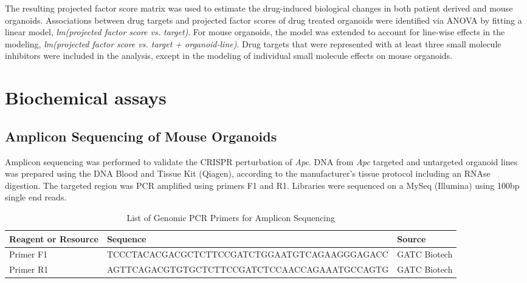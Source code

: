 \begin{flushleft}
\smallbreak
The resulting projected factor score matrix was used to estimate the drug-induced biological changes in both patient derived and mouse organoids. Associations between drug targets and projected factor scores of drug treated organoids were identified via ANOVA by fitting a linear model, \textit{lm(projected factor score vs. target)}. For mouse organoids, the model was extended to account for line-wise effects in the modeling, \textit{lm(projected factor score vs. target + organoid-line)}. Drug targets that were represented with at least three small molecule inhibitors were included in the analysis, except in the modeling of individual small molecule effects on mouse organoids.


\section{Biochemical assays}

\subsection{Amplicon Sequencing of Mouse Organoids}
Amplicon sequencing was performed to validate the CRISPR perturbation of \textit{Apc}. DNA from \textit{Apc} targeted and untargeted organoid lines was prepared using the DNA Blood and Tissue Kit (Qiagen), according to the manufacturer’s tissue protocol including an RNAse digestion. The targeted region was PCR amplified using primers F1 and R1. Libraries were sequenced on a MySeq (Illumina) using 100bp single end reads. 

\begin{table}[htb]
\caption{List of Genomic PCR Primers for Amplicon Sequencing}
\label{tab:oligonucleotides} %
\begin{tabularx}{\textwidth}{XlX}
\toprule
\textbf{Reagent or Resource} & \textbf{Sequence} & \textbf{Source} \\
\midrule
Primer F1 & TCCCTACACGACGCTCTTCCGATCTGGAATGTCAGAAGGGAGACC & GATC Biotech \\
Primer R1 & AGTTCAGACGTGTGCTCTTCCGATCTCCAACCAGAAATGCCAGTG & GATC Biotech \\
\bottomrule
\end{tabularx}
\end{table}


\end{flushleft}
